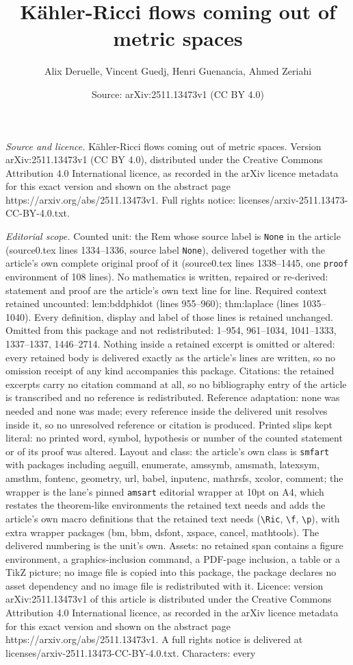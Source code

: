\documentclass[10pt,a4paper]{amsart}
\title[K\"ahler-Ricci flows coming out of metric spaces]{K\"ahler-Ricci flows coming out of metric spaces}
\author{Alix Deruelle, Vincent Guedj, Henri Guenancia, Ahmed Zeriahi}
\date{Source: arXiv:2511.13473v1 (CC BY 4.0)}
\begin{document}
\maketitle

\noindent\emph{Source and licence.} K\"ahler-Ricci flows coming out of metric spaces. Version arXiv:2511.13473v1 (CC BY 4.0), distributed under the Creative Commons Attribution 4.0 International licence, as recorded in the arXiv licence metadata for this exact version and shown on the abstract page https://arxiv.org/abs/2511.13473v1. Full rights notice: licenses/arxiv-2511.13473-CC-BY-4.0.txt.\par\smallskip

\noindent\textit{Editorial scope.} Counted unit: the Rem whose source label is \texttt{None} in the article (source0.tex lines 1334--1336, source label \texttt{None}), delivered together with the article's own complete original proof of it (source0.tex lines 1338--1445, one \texttt{proof} environment of 108 lines). No mathematics is written, repaired or re-derived: statement and proof are the article's own text line for line. Required context retained uncounted: lem:bddphidot (lines 955--960); thm:laplace (lines 1035--1040). Every definition, display and label of those lines is retained unchanged. Omitted from this package and not redistributed: 1--954, 961--1034, 1041--1333, 1337--1337, 1446--2714. Nothing inside a retained excerpt is omitted or altered: every retained body is delivered exactly as the article's lines are written, so no omission receipt of any kind accompanies this package. Citations: the retained excerpts carry no citation command at all, so no bibliography entry of the article is transcribed and no reference is redistributed. Reference adaptation: none was needed and none was made; every reference inside the delivered unit resolves inside it, so no unresolved reference or citation is produced. Printed slips kept literal: no printed word, symbol, hypothesis or number of the counted statement or of its proof was altered. Layout and class: the article's own class is \texttt{smfart} with packages including aeguill, enumerate, amssymb, amsmath, latexsym, amsthm, fontenc, geometry, url, babel, inputenc, mathrsfs, xcolor, comment; the wrapper is the lane's pinned \texttt{amsart} editorial wrapper at 10pt on A4, which restates the theorem-like environments the retained text needs and adds the article's own macro definitions that the retained text needs (\texttt{\textbackslash Ric}, \texttt{\textbackslash f}, \texttt{\textbackslash p}), with extra wrapper packages (bm, bbm, dsfont, xspace, cancel, mathtools). The delivered numbering is the unit's own. Assets: no retained span contains a figure environment, a graphics-inclusion command, a PDF-page inclusion, a table or a TikZ picture; no image file is copied into this package, the package declares no asset dependency and no image file is redistributed with it. Licence: version arXiv:2511.13473v1 of this article is distributed under the Creative Commons Attribution 4.0 International licence, as recorded in the arXiv licence metadata for this exact version and shown on the abstract page https://arxiv.org/abs/2511.13473v1. A full rights notice is delivered at licenses/arxiv-2511.13473-CC-BY-4.0.txt. Characters: every 
\end{document}
